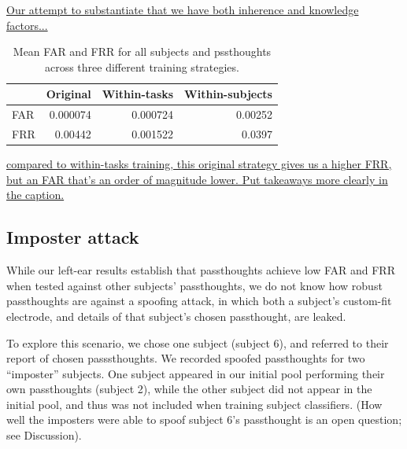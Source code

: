 \documentclass[letterpaper,twocolumn,10pt]{article}
\begin{document}
\underline{Our attempt to substantiate that we have both inherence and knowledge factors...}

\begin{table}[h]
\begin{center}
\begin{tabular}{lrrr}
 & Original & Within-tasks & Within-subjects\\
\hline
FAR & 0.000074 & 0.000724 & 0.00252\\
FRR & 0.00442 & 0.001522 & 0.0397\\
\end{tabular}
\end{center}
\caption{Mean FAR and FRR for all subjects and pssthoughts across three different training strategies.}
\end{table}

\underline{compared to within-tasks training, this original strategy gives us a higher FRR, but an FAR that's an order of magnitude lower. Put takeaways more clearly in the caption.}


% 
%            
% 
 
% 
%
%
% 
% 


\subsection{Imposter attack}

While our left-ear results establish that passthoughts achieve low FAR and FRR when tested against other subjects' passthoughts, we do not know how robust passthoughts are against a spoofing attack, in which both a subject's custom-fit electrode, and details of that subject's chosen passthought, are leaked. 

To explore this scenario, we chose one subject (subject 6), and referred to their report of chosen passsthoughts. We recorded spoofed passthoughts for two ``imposter'' subjects. One subject appeared in our initial pool performing their own passthoughts (subject 2), while the other subject did not appear in the initial pool, and thus was not included when training subject classifiers. (How well the imposters were able to spoof subject 6's passthought is an open question; see Discussion).
\end{document}
